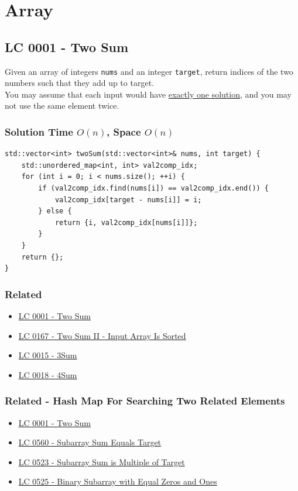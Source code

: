 \chapter{Array}
\section{LC 0001 - Two Sum}\label{lc0001}
Given an array of integers {\colorbox{CodeBackground}{\lstinline|nums|}} and an integer {\colorbox{CodeBackground}{\lstinline|target|}}, return indices of the two numbers such that they add up to target.\\

You may assume that each input would have \ul{exactly one solution}, and you may not use the same element twice.

\subsection*{Solution {\scriptsize\color{gray}\Coffeecup\hspace{1mm}Time $O(n)$, Space $O(n)$}}
\begin{lstlisting}
std::vector<int> twoSum(std::vector<int>& nums, int target) {
	std::unordered_map<int, int> val2comp_idx;
	for (int i = 0; i < nums.size(); ++i) {
		if (val2comp_idx.find(nums[i]) == val2comp_idx.end()) {
			val2comp_idx[target - nums[i]] = i;
		} else {
			return {i, val2comp_idx[nums[i]]};
		}
	}
	return {};
}
\end{lstlisting}

\subsection*{Related}
\begin{itemize}
\item \hyperref[lc0001]{LC 0001 - Two Sum}
\item \hyperref[lc0167]{LC 0167 - Two Sum II - Input Array Is Sorted}
\item \hyperref[lc0015]{LC 0015 - 3Sum}
\item \hyperref[lc0018]{LC 0018 - 4Sum}
\end{itemize}

\subsection*{Related - Hash Map For Searching Two Related Elements}
\begin{itemize}
\item \hyperref[lc0001]{LC 0001 - Two Sum}
\item \hyperref[lc0560]{LC 0560 - Subarray Sum Equals Target}
\item \hyperref[lc0523]{LC 0523 - Subarray Sum is Multiple of Target}
\item \hyperref[lc0525]{LC 0525 - Binary Subarray with Equal Zeros and Ones}
\end{itemize}

